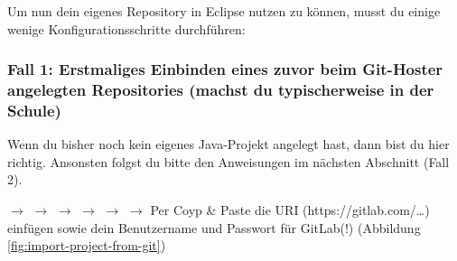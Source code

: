 %
% 
%
%
%
%
Um nun dein eigenes Repository in Eclipse nutzen zu können, musst du einige
wenige Konfigurationsschritte durchführen:

\subsubsection{Fall 1: Erstmaliges Einbinden eines zuvor beim Git-Hoster
angelegten Repositories (machst du typischerweise in der Schule)}

Wenn du bisher noch kein eigenes Java-Projekt angelegt hast, dann bist du hier
richtig. Ansonsten folgst du bitte den Anweisungen im nächsten Abschnitt
(Fall 2).

 $\rightarrow$  $\rightarrow$ 
$\rightarrow$  $\rightarrow$  $\rightarrow$
 $\rightarrow$  Per Coyp \& Paste die URI
(https://gitlab.com/\ldots) einfügen sowie dein Benutzername und Passwort für
GitLab(!) (Abbildung \ref{fig:import-project-from-git})


